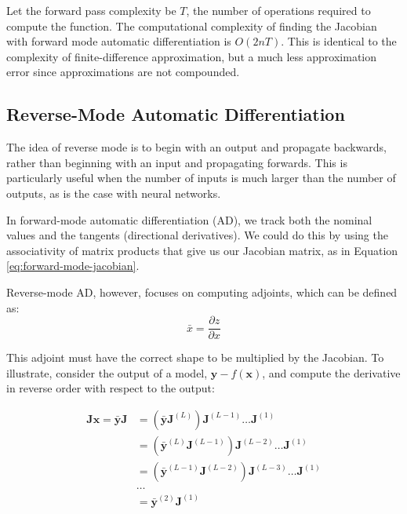 Let the forward pass complexity be $T$, the number of operations required to compute the function. The computational complexity of finding the Jacobian with forward mode automatic differentiation is $O(2nT)$. This is identical to the complexity of finite-difference approximation, but a much less approximation error since approximations are not compounded.

\subsection{Reverse-Mode Automatic Differentiation}

The idea of reverse mode is to begin with an output and propagate backwards, rather than beginning with an input and propagating forwards. This is particularly useful when the number of inputs is much larger than the number of outputs, as is the case with neural networks. \bigskip

In forward-mode automatic differentiation (AD), we track both the nominal values and the tangents (directional derivatives). We could do this by using the associativity of matrix products that give us our Jacobian matrix, as in Equation \ref{eq:forward-mode-jacobian}. \bigskip

Reverse-mode AD, however, focuses on computing adjoints, which can be defined as:
\[
    \bar{x} = \frac{\partial z}{\partial x}
\]


This adjoint must have the correct shape to be multiplied by the Jacobian. To illustrate, consider the output of a model, \( \bm{y} - f(\bm{x}) \), and compute the derivative in reverse order with respect to the output:



\begin{align*}
    \bm{Jx} = \bar{\bm{y}} \bm{J} & = (\bar{\bm{y}} \bm{J}^{(L)}) \bm{J}^{(L-1)} \dots \bm{J}^{(1)}           \\
                                  & = (\bar{\bm{y}}^{(L)} \bm{J}^{(L-1)}) \bm{J}^{(L-2)} \dots \bm{J}^{(1)}   \\
                                  & = (\bar{\bm{y}}^{(L-1)} \bm{J}^{(L-2)}) \bm{J}^{(L-3)} \dots \bm{J}^{(1)} \\
                                  & \dots                                                                     \\
                                  & = \bar{\bm{y}}^{(2)} \bm{J}^{(1)}
\end{align*}

